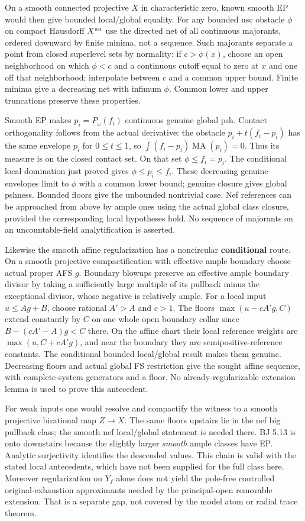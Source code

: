 \documentclass[
  11pt,
]{article}
\providecommand{\MA}{\operatorname{MA}}
\begin{document}
On a smooth connected projective \(X\) in characteristic zero, known
smooth EP would then give bounded local/global equality. For any bounded
usc obstacle \(\phi\) on compact Hausdorff \(X^{\rm an}\) use the
directed net of all continuous majorants, ordered downward by finite
minima, not a sequence. Such majorants separate a point from closed
superlevel sets by normality: if \(c>\phi(x)\), choose an open
neighborhood on which \(\phi<c\) and a continuous cutoff equal to zero
at \(x\) and one off that neighborhood; interpolate between \(c\) and a
common upper bound. Finite minima give a decreasing net with infimum
\(\phi\). Common lower and upper truncations preserve these properties.

Smooth EP makes \(p_i=P_\omega(f_i)\) continuous genuine global psh.
Contact orthogonality follows from the actual derivative: the obstacle
\(p_i+t(f_i-p_i)\) has the same envelope \(p_i\) for \(0\le t\le1\), so
\(\int(f_i-p_i)\MA(p_i)=0\). Thus its measure is on the closed contact
set. On that set \(\phi\le f_i=p_i\). The conditional local domination
just proved gives \(\phi\le p_i\le f_i\). These decreasing genuine
envelopes limit to \(\phi\) with a common lower bound; genuine closure
gives global pshness. Bounded floors give the unbounded nontrivial case.
Nef references can be approached from above by ample ones using the
actual global class closure, provided the corresponding local hypotheses
hold. No sequence of majorants on an uncountable-field analytification
is asserted.

Likewise the smooth affine regularization has a noncircular
\textbf{conditional} route. On a smooth projective compactification with
effective ample boundary choose actual proper AFS \(g\). Boundary
blowups preserve an effective ample boundary divisor by taking a
sufficiently large multiple of its pullback minus the exceptional
divisor, whose negative is relatively ample. For a local input
\(u\le Ag+B\), choose rational \(A'>A\) and \(c>1\). The floors
\(\max(u-cA'g,C)\) extend constantly by \(C\) on one whole open boundary
collar since \(B-(cA'-A)g<C\) there. On the affine chart their local
reference weights are \(\max(u,C+cA'g)\), and near the boundary they are
semipositive-reference constants. The conditional bounded local/global
result makes them genuine. Decreasing floors and actual global FS
restriction give the sought affine sequence, with complete-system
generators and a floor. No already-regularizable extension lemma is used
to prove this antecedent.

For weak inputs one would resolve and compactify the witness to a smooth
projective birational map \(Z\to X\). The same floors upstairs lie in
the nef big pullback class; the smooth nef local/global statement is
needed there. BJ 5.13 is onto downstairs because the slightly larger
\emph{smooth} ample classes have EP. Analytic surjectivity identifies
the descended values. This chain is valid with the stated local
antecedents, which have not been supplied for the full class here.
Moreover regularization on \(Y_f\) alone does not yield the pole-free
controlled original-exhaustion approximants needed by the principal-open
removable extension. That is a separate gap, not covered by the model
atom or radial trace theorem.
\end{document}
